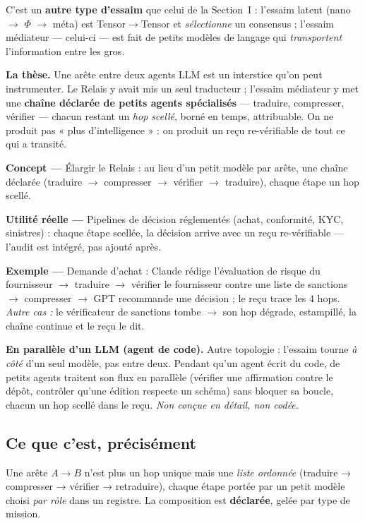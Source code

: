 \documentclass[11pt]{article}
\newcommand{\concept}[1]{{\color{efenavy}\textbf{Concept —} }#1\par}
\newcommand{\exemple}[1]{{\color{efeamber}\textbf{Exemple —} }#1\par}
\newcommand{\utilite}[1]{{\color{efeplum}\textbf{Utilité réelle —} }#1\par}
\begin{document}
C'est un \textbf{autre type d'essaim} que celui de la Section~I : l'essaim latent
(nano $\rightarrow$ $\Phi$ $\rightarrow$ méta) est Tensor$\rightarrow$Tensor et
\emph{sélectionne} un consensus ; l'essaim médiateur — celui-ci — est fait de petits modèles
de langage qui \emph{transportent} l'information entre les gros.

\textbf{La thèse.} Une arête entre deux agents LLM est un interstice qu'on peut instrumenter.
Le Relais y avait mis un seul traducteur ; l'essaim médiateur y met une \textbf{chaîne déclarée de
petits agents spécialisés} — traduire, compresser, vérifier — chacun restant un \emph{hop
scellé}, borné en temps, attribuable. On ne produit pas « plus d'intelligence » : on produit un
reçu re-vérifiable de tout ce qui a transité.

\concept{Élargir le Relais : au lieu d'un petit modèle par arête, une chaîne déclarée (traduire
$\rightarrow$ compresser $\rightarrow$ vérifier $\rightarrow$ traduire), chaque étape un hop
scellé.}
\utilite{Pipelines de décision réglementés (achat, conformité, KYC, sinistres) : chaque étape
scellée, la décision arrive avec un reçu re-vérifiable — l'audit est intégré, pas ajouté après.}
\exemple{Demande d'achat : Claude rédige l'évaluation de risque du fournisseur $\rightarrow$
traduire $\rightarrow$ vérifier le fournisseur contre une liste de sanctions $\rightarrow$
compresser $\rightarrow$ GPT recommande une décision ; le reçu trace les 4 hops. \emph{Autre
cas :} le vérificateur de sanctions tombe $\rightarrow$ son hop dégrade, estampillé, la chaîne
continue et le reçu le dit.}

\textbf{En parallèle d'un LLM (agent de code).} Autre topologie : l'essaim tourne \emph{à côté} d'un
seul modèle, pas entre deux. Pendant qu'un agent écrit du code, de petits agents traitent son flux
en parallèle (vérifier une affirmation contre le dépôt, contrôler qu'une édition respecte un schéma)
sans bloquer sa boucle, chacun un hop scellé dans le reçu. \emph{Non conçue en détail, non codée.}

\subsection{Ce que c'est, précisément}
Une arête $A\rightarrow B$ n'est plus un hop unique mais une \emph{liste ordonnée} (traduire →
compresser → vérifier → retraduire), chaque étape portée par un petit modèle choisi \emph{par rôle}
dans un registre. La composition est \textbf{déclarée}, gelée par type de mission.
\end{document}
